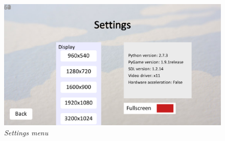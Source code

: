 \documentclass[a4paper,12pt]{article}
\begin{document}
\vspace{10pt}
\noindent
\begin{figure}[h]
\includegraphics[width=\textwidth]{img/menushot4.eps}\\
\emph{%
    Settings menu
}
\end{figure}
\end{document}
